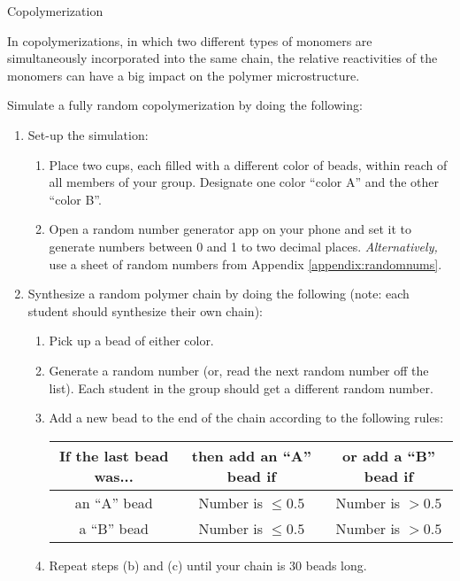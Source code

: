 \begin{activity}{Copolymerization}
\begin{model}
	\label{\labelbase:mdl:simulation}

	In copolymerizations, in which two different types of monomers are simultaneously incorporated into the same chain, the relative reactivities of the monomers can have a big impact on the polymer microstructure.
	
	Simulate a fully random copolymerization by doing the following:
	\begin{enumerate}
		\item Set-up the simulation:
			\begin{enumerate}
				\item Place two cups, each filled with a different color of beads, within reach of all members of your group.  Designate one color ``color A'' and the other ``color B''.
				\item Open a random number generator app on your phone and set it to generate numbers between 0 and 1 to two decimal places.  \emph{Alternatively,} use a sheet of random numbers from Appendix \ref{appendix:randomnums}.
			\end{enumerate}
		\item Synthesize a random polymer chain by doing the following (note: each student should synthesize their own chain):
			\begin{enumerate}
				\item Pick up a bead of either color.
				\item Generate a random number (or, read the next random number off the list).  Each student in the group should get a different random number.
				\item Add a new bead to the end of the chain according to the following rules:
					\begin{center}
					\renewcommand{\arraystretch}{1.5}
					\begin{tabular}{|c|c|c|}
						\hline
						\textbf{If the last bead was...} &  \textbf{then add an ``A'' bead if} & \textbf{or add a ``B'' bead if}\\\hline
						 an ``A'' bead & Number is $\leq 0.5$ & Number is $> 0.5$ \\\hline
						 a ``B'' bead & Number is $\leq 0.5$ & Number is $> 0.5$ \\\hline
					\end{tabular}
					\end{center}
				\item Repeat steps (b) and (c) until your chain is 30 beads long.
			\end{enumerate}
	\end{enumerate}
	

\end{model}
\end{activity}
